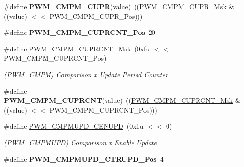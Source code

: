 \begin{DoxyCompactItemize}
\mbox{\label{group__SAME70__PWM_ga133c06bab5d24a9d97b1c7f44c698ae4}} 
\#define {\bfseries P\+W\+M\+\_\+\+C\+M\+P\+M\+\_\+\+C\+U\+PR}(value)~((\mbox{\hyperlink{group__SAMV71__PWM_gaadd54a225ed379648b3693dfbcc56a15}{P\+W\+M\+\_\+\+C\+M\+P\+M\+\_\+\+C\+U\+P\+R\+\_\+\+Msk}} \& ((value) $<$$<$ P\+W\+M\+\_\+\+C\+M\+P\+M\+\_\+\+C\+U\+P\+R\+\_\+\+Pos)))
\item 
\mbox{\label{group__SAME70__PWM_ga046611de8ee0cc576937fed666f286ea}} 
\#define {\bfseries P\+W\+M\+\_\+\+C\+M\+P\+M\+\_\+\+C\+U\+P\+R\+C\+N\+T\+\_\+\+Pos}~20
\item 
\mbox{\label{group__SAME70__PWM_ga2fbf78eae63da097297b020afcf6febe}} 
\#define \mbox{\hyperlink{group__SAME70__PWM_ga2fbf78eae63da097297b020afcf6febe}{P\+W\+M\+\_\+\+C\+M\+P\+M\+\_\+\+C\+U\+P\+R\+C\+N\+T\+\_\+\+Msk}}~(0xfu $<$$<$ P\+W\+M\+\_\+\+C\+M\+P\+M\+\_\+\+C\+U\+P\+R\+C\+N\+T\+\_\+\+Pos)
\begin{DoxyCompactList}\small\item\em (P\+W\+M\+\_\+\+C\+M\+PM) Comparison x Update Period Counter \end{DoxyCompactList}\item 
\mbox{\label{group__SAME70__PWM_gae1103977edb4f7f53e3050ded3900262}} 
\#define {\bfseries P\+W\+M\+\_\+\+C\+M\+P\+M\+\_\+\+C\+U\+P\+R\+C\+NT}(value)~((\mbox{\hyperlink{group__SAMV71__PWM_ga2fbf78eae63da097297b020afcf6febe}{P\+W\+M\+\_\+\+C\+M\+P\+M\+\_\+\+C\+U\+P\+R\+C\+N\+T\+\_\+\+Msk}} \& ((value) $<$$<$ P\+W\+M\+\_\+\+C\+M\+P\+M\+\_\+\+C\+U\+P\+R\+C\+N\+T\+\_\+\+Pos)))
\item 
\mbox{\label{group__SAME70__PWM_ga63120711aff24e164abacbf8283ad2f0}} 
\#define \mbox{\hyperlink{group__SAME70__PWM_ga63120711aff24e164abacbf8283ad2f0}{P\+W\+M\+\_\+\+C\+M\+P\+M\+U\+P\+D\+\_\+\+C\+E\+N\+U\+PD}}~(0x1u $<$$<$ 0)
\begin{DoxyCompactList}\small\item\em (P\+W\+M\+\_\+\+C\+M\+P\+M\+U\+PD) Comparison x Enable Update \end{DoxyCompactList}\item 
\mbox{\label{group__SAME70__PWM_gaa51d75e45c3eb87cf7a0c94d36919e29}} 
\#define {\bfseries P\+W\+M\+\_\+\+C\+M\+P\+M\+U\+P\+D\+\_\+\+C\+T\+R\+U\+P\+D\+\_\+\+Pos}~4

\end{DoxyCompactItemize}
